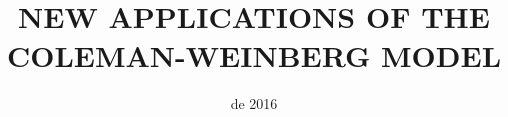 \documentclass[aps,prd,preprintnumbers,nofootinbibn,twocolumn]{revtex4}
\begin{document}
%






\title{NEW APPLICATIONS OF THE COLEMAN-WEINBERG MODEL\\[0.4cm]}
\thispagestyle{empty}


\date{de 2016}
\end{document}
